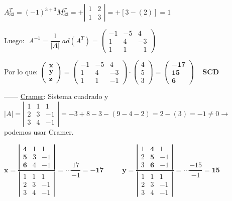 \begin{proofw}
$A^T_{33}=(-1)^{3+3}M^T_{33}=+\left| \begin{matrix} 1&2\\1&3 \end{matrix} \right|=
+[ 3- (2 )]= 1$

Luego: $\; A^{-1}= \dfrac 1 {|A|}\; ad(A^T)= \left( \begin{matrix}
 	-1&-5&4\\1&4&-3\\1&1&-1
 \end{matrix} \right)$
 
 Por lo que: $\boldsymbol{ \left( \begin{matrix} x\\y\\z \end{matrix} \right)}=\left( \begin{matrix}
 	-1&-5&4\\1&4&-3\\1&1&-1
 \end{matrix} \right)\cdot \left( \begin{matrix} 4\\5\\3 \end{matrix} \right) =\boldsymbol{ \left( \begin{matrix} -17\\15\\6 \end{matrix} \right)}\;\; \; $ \textbf{SCD}

------ \underline{Cramer}: Sistema cuadrado y $|A|=\left| \begin{matrix} 1&1&1\\2&3&-1\\3&4&-1 \end{matrix} \right| = -3+8-3-(9-4-2)=2-(3)=-1\neq 0 \to$ podemos usar Cramer.

\noindent $\boldsymbol{x}=\dfrac {\left| \begin{matrix} \boldsymbol{4}&1&1\\\boldsymbol{5}&3&-1\\\boldsymbol{6}&4&-1 \end{matrix} \right|}  {\left| \begin{matrix} 1&1&1\\2&3&-1\\3&4&-1 \end{matrix} \right|} = \cdots \dfrac {17}{-1}=\boldsymbol{-17}$
$\; \qquad \boldsymbol{y}=\dfrac {\left| \begin{matrix} 1&\boldsymbol{4}&1\\2&\boldsymbol{5}&-1\\3&\boldsymbol{6}&-1 \end{matrix} \right|}  {\left| \begin{matrix} 1&1&1\\2&3&-1\\3&4&-1 \end{matrix} \right|} = \cdots \dfrac {-15}{-1}=\boldsymbol{15}$


\end{proofw}
